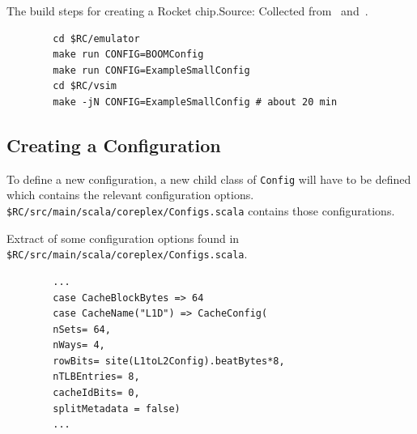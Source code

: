 \documentclass[journal,a4paper]{IEEEtran}
\begin{document}

\begin{table}
	\caption{The build steps for creating a Rocket chip.\newline\hspace{\linewidth}Source: Collected from~\cite{rc_github} and~\cite{boom_github}.}
	\label{rcmake}
	\begin{verbatim}
		cd $RC/emulator
		make run CONFIG=BOOMConfig
		make run CONFIG=ExampleSmallConfig
		cd $RC/vsim
		make -jN CONFIG=ExampleSmallConfig # about 20 min
	\end{verbatim}
\end{table}


\subsection{Creating a Configuration}
To define a new configuration, a new child class of \texttt{Config} will have to be defined which contains the relevant configuration options. \texttt{\$RC/src/main/scala/coreplex/Configs.scala} contains those configurations.

\begin{table}
	\caption{Extract of some configuration options found in \texttt{\$RC/src/main/scala/coreplex/Configs.scala}.}
	\label{config_options}
	\begin{verbatim}
		...
		case CacheBlockBytes => 64
		case CacheName("L1D") => CacheConfig(
		nSets= 64,
		nWays= 4,
		rowBits= site(L1toL2Config).beatBytes*8,
		nTLBEntries= 8,
		cacheIdBits= 0,
		splitMetadata = false)
		...
	\end{verbatim}
\end{table}


%
\end{document}
